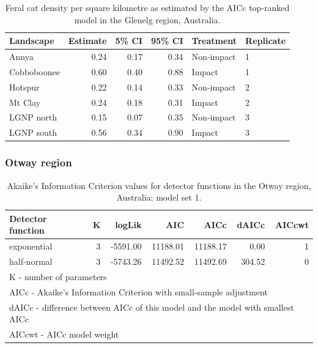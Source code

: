 \documentclass[preprint, 3p, authoryear]{elsarticle} %
\begin{document}
\begin{longtable}[t]{lrrrll}
\caption{\label{tab:density-landscape-est}Feral cat density per square kilometre as estimated by the AICc top-ranked model in the Glenelg region, Australia.}\\
\toprule
Landscape & Estimate & 5\% CI & 95\% CI & Treatment & Replicate\\
\midrule
Annya & 0.24 & 0.17 & 0.34 & Non-impact & 1\\
Cobboboonee & 0.60 & 0.40 & 0.88 & Impact & 1\\
Hotspur & 0.22 & 0.14 & 0.33 & Non-impact & 2\\
Mt Clay & 0.24 & 0.18 & 0.31 & Impact & 2\\
LGNP north & 0.15 & 0.07 & 0.35 & Non-impact & 3\\
\addlinespace
LGNP south & 0.56 & 0.34 & 0.90 & Impact & 3\\
\bottomrule
\end{longtable}
\endgroup{}

\newpage

\hypertarget{otway-region-3}{%
\subsubsection{Otway region}\label{otway-region-3}}

\begingroup\fontsize{10}{12}\selectfont

\begin{longtable}[t]{lrrrrrr}
\caption{\label{tab:density-aic-o-1}Akaike's Information Criterion values for detector functions in the Otway region, Australia; model set 1.}\\
\toprule
Detector function & K & logLik & AIC & AICc & dAICc & AICcwt\\
\midrule
exponential & 3 & -5591.00 & 11188.01 & 11188.17 & 0.00 & 1\\
half-normal & 3 & -5743.26 & 11492.52 & 11492.69 & 304.52 & 0\\
\bottomrule
\multicolumn{7}{l}{\rule{0pt}{1em}K - number of parameters}\\
\multicolumn{7}{l}{\rule{0pt}{1em}AICc - Akaike's Information Criterion with small-sample adjustment}\\
\multicolumn{7}{l}{\rule{0pt}{1em}dAICc - difference between AICc of this model and the model with smallest AICc}\\
\multicolumn{7}{l}{\rule{0pt}{1em}AICcwt - AICc model weight}\\
\end{longtable}
\endgroup{}
\end{document}
